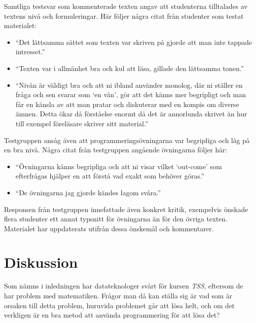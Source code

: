 \documentclass[12pt,a4paper,twoside,openright]{article}
\begin{document}
Samtliga testsvar som kommenterade texten angav att studenterna
tilltalades av textens nivå och formuleringar. Här följer några citat
från studenter som testat materialet:
\begin{itemize}
\item ``Det lättsamma sättet som texten var skriven på gjorde att man
 inte tappade intresset.''
\item ``Texten var i allmänhet bra och kul att läsa, gillade den
 lättsamma tonen.''
\item ``Nivån är väldigt bra och att ni ibland använder monolog, där
 ni ställer en fråga och sen svarar som `en vän', gör att det känns
 mer begripligt och man får en känsla av att man pratar och
 diskuterar med en kompis om diverse ämnen. Detta ökar då förståelse
 enormt då det är annorlunda skrivet än hur till exempel föreläsare
 skriver sitt material.''
\end{itemize}

Testgruppen ansåg även att programmeringsövningarna var begripliga och
låg på en bra nivå. Några citat från testgruppen angående övningarna
följer här:
\begin{itemize}
\item ``Övningarna känns begripliga och att ni visar vilket `out-come'
 som efterfrågas hjälper en att förstå vad exakt som behöver göras.''
\item ``De övningarna jag gjorde kändes lagom svåra.''
\end{itemize}

Responsen från testgruppen innefattade även konkret kritik, exempelvis
önskade flera studenter ett annat typsnitt för övningarna än för den
övriga texten. Materialet har uppdaterats utifrån dessa önskemål och
kommentarer.

\section{Diskussion}



Som nämns i inledningen har datateknologer svårt för kursen
\textit{TSS}, eftersom de har problem med matematiken. Frågor man då
kan ställa sig är vad som är orsaken till detta problem, huruvida
problemet går att lösa helt, och om det verkligen är en bra metod att
använda programmering för att lösa det?
\end{document}
